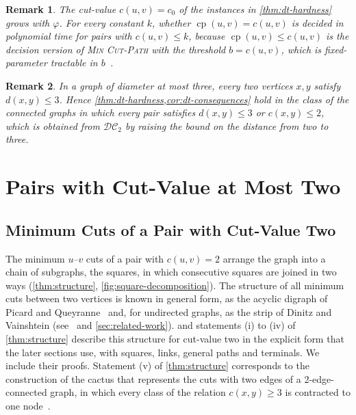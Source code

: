 \documentclass[pdflatex,sn-mathphys-num]{sn-jnl}%
\theoremstyle{thmstyleone}%
\theoremstyle{thmstyletwo}%
\newtheorem{remark}{Remark}%
\theoremstyle{thmstylethree}%
\newcommand{\cp}{\operatorname{cp}}%
\newcommand{\DC}{\mathcal{DC}_2}%
\newcommand{\MinCutPath}{\textsc{Min Cut-Path}}%
\begin{document}
\begin{remark}
\label{rem:dt-bounded-cut-value}
The cut-value $c(u, v) = c_0$ of the instances in \cref{thm:dt-hardness} grows with $\varphi$.
For every constant $k$, whether $\cp(u, v) = c(u, v)$ is decided in polynomial time for pairs with $c(u, v) \leq k$, because $\cp(u, v) \leq c(u, v)$ is the decision version of \MinCutPath{} with the threshold $b = c(u, v)$, which is fixed-parameter tractable in $b$~\cite[Theorem~8.4]{Michel2026MinCutPath}.
\end{remark}

\begin{remark}
\label{rem:dt-shifted-class}
In a graph of diameter at most three, every two vertices $x, y$ satisfy $d(x, y) \leq 3$.
Hence \cref{thm:dt-hardness,cor:dt-consequences} hold in the class of the connected graphs in which every pair satisfies $d(x, y) \leq 3$ or $c(x, y) \leq 2$, which is obtained from $\DC$ by raising the bound on the distance from two to three.
\end{remark}

\section{Pairs with Cut-Value at Most Two}
\label{sec:squares}

\subsection{Minimum Cuts of a Pair with Cut-Value Two}
\label{sec:structure}

The minimum $u$--$v$ cuts of a pair with $c(u, v) = 2$ arrange the graph into a chain of subgraphs, the squares, in which consecutive squares are joined in two ways (\cref{thm:structure}, \cref{fig:square-decomposition}).
The structure of all minimum cuts between two vertices is known in general form, as the acyclic digraph of Picard and Queyranne~\cite{PicardQueyranne1980} and, for undirected graphs, as the strip of Dinitz and Vainshtein (see~\cite{BaswanaPandey2025Carcass} and \cref{sec:related-work}).
 and statements (i) to (iv) of \cref{thm:structure} describe this structure for cut-value two in the explicit form that the later sections use, with squares, links, general paths and terminals.
We include their proofs.
Statement (v) of \cref{thm:structure} corresponds to the construction of the cactus that represents the cuts with two edges of a 2-edge-connected graph, in which every class of the relation $c(x, y) \geq 3$ is contracted to one node~\cite{Mehlhorn2017Certifying}.
\end{document}
